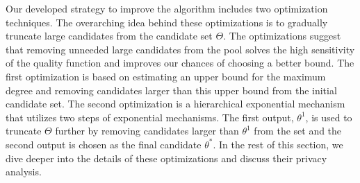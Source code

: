 Our developed strategy to improve the algorithm includes two optimization techniques. The overarching idea behind these optimizations is to gradually truncate large candidates from the candidate set $\Theta$. The optimizations suggest that removing unneeded large candidates from the pool solves the high sensitivity of the quality function and improves our chances of choosing a better bound. The first optimization is based on estimating an upper bound for the maximum degree and removing candidates larger than this upper bound from the initial candidate set. The second optimization is a hierarchical exponential mechanism that utilizes two steps of exponential mechanisms. The first output, $\theta^1$, is used to truncate $\Theta$ further by removing candidates larger than $\theta^1$ from the set and the second output is chosen as the final candidate $\theta^*$. In the rest of this section, we dive deeper into the details of these optimizations and discuss their privacy analysis. 



